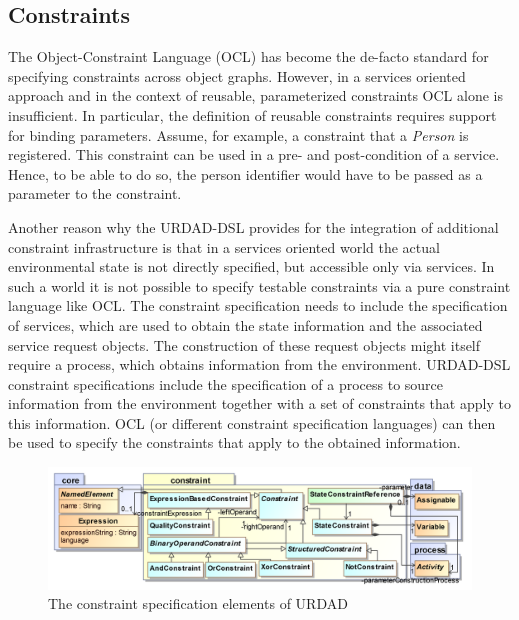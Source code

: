 
\subsection{Constraints}

The Object-Constraint Language (OCL) has become the de-facto standard for specifying constraints across object graphs. However, in a services oriented approach and in the context of reusable, parameterized constraints OCL alone is insufficient. In particular, the definition of reusable constraints requires support for binding parameters. Assume, for example, a constraint that a \emph{Person} is registered. This constraint can be used in a pre- and post-condition of a service. Hence, to be able to do so, the person identifier would have to be passed as a parameter to the constraint.

Another reason why the URDAD-DSL provides for the integration of additional constraint infrastructure is that in a services oriented world the actual environmental state is not directly specified, but accessible only via services. In such a world it is not possible to specify testable constraints via a pure constraint language like OCL. The constraint specification needs to include the specification of services, which are used to obtain the state information and the associated service request objects. The construction of these request objects might itself require a process, which obtains information from the environment. URDAD-DSL constraint specifications include the specification of a process to source information from the environment together with a set of constraints that apply to this information. OCL (or different constraint specification languages) can then be used to specify the constraints that apply to the obtained information.

\begin{figure}[Htbp]
  \centering
  \includegraphics{constraint}
  \caption{The constraint specification elements of URDAD}
  \label{fig:metamodel}
\end{figure}

